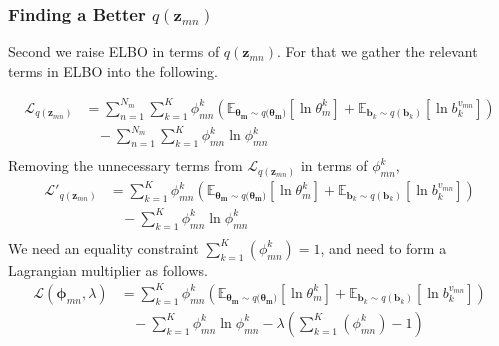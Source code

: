 \documentclass[a4]{article}
\begin{document}
\subsubsection{Finding a Better $q(\mathbf{z}_{mn})$}
Second we raise ELBO in terms of $q(\mathbf{z}_{mn})$.
For that we gather the relevant terms in ELBO into the following.

\begin{equation}
\begin{aligned}
    \mathcal{L}_{q(\mathbf{z}_{mn})}
&=
    \sum_{n=1}^{N_m} \sum_{k=1}^{K} 
        \phi_{mn}^{k}
        \left(   \mathbb{E}_{\bm{\theta_m} \sim q(\bm{\theta_m)}}
                 [\ln \theta_m^k] 
               + \mathbb{E}_{\mathbf{b}_k \sim q(\mathbf{b}_k)}
                 [\ln b_{k}^{v_{mn}}] \right)\\
      &\:\:\:\:-\sum_{n = 1}^{N_m} \sum_{k=1}^K 
          \phi_{mn}^k \ln \phi_{mn}^k\\
\end{aligned}
\end{equation}
Removing the unnecessary terms from 
$\mathcal{L}_{q(\mathbf{z}_{mn})}$ in terms of $\phi_{mn}^k$,
\begin{equation}
\begin{aligned}
    \mathcal{L}'_{q(\mathbf{z}_{mn})}
&=
    \sum_{k=1}^{K} 
        \phi_{mn}^{k}
        \left(   \mathbb{E}_{\bm{\theta_m} \sim q(\bm{\theta_m)}}
                 [\ln \theta_m^k] 
               + \mathbb{E}_{\mathbf{b}_k \sim q(\mathbf{b}_k)}
                 [\ln b_{k}^{v_{mn}}] \right)\\
      &\:\:\:\:- \sum_{k=1}^K 
          \phi_{mn}^k \ln \phi_{mn}^k\\
\end{aligned}
\end{equation}
We need an equality constraint $\sum_{k=1}^K(\phi_{mn}^k)= 1$,
and need to form a Lagrangian multiplier as follows.
\begin{equation}
\begin{aligned}
    \mathcal{L}(\bm{\phi}_{mn}, \lambda)
&=
    \sum_{k=1}^{K} 
        \phi_{mn}^{k}
        \left(   \mathbb{E}_{\bm{\theta_m} \sim q(\bm{\theta_m)}}
                 [\ln \theta_m^k] 
               + \mathbb{E}_{\mathbf{b}_k \sim q(\mathbf{b}_k)}
                 [\ln b_{k}^{v_{mn}}] \right)\\
      &\:\:\:\:- \sum_{k=1}^K 
          \phi_{mn}^k \ln \phi_{mn}^k
      - \lambda \left( \sum_{k=1}^K(\phi_{mn}^k) - 1 \right)\\
\end{aligned}
\end{equation}
\end{document}

